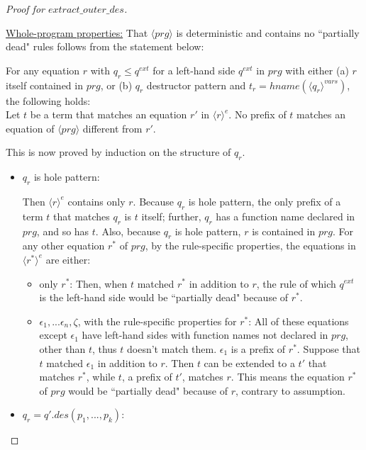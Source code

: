 \documentclass[11pt]{article} %
\begin{document}
\begin{proof}[Proof for $extract\_outer\_des$]
\begin{itemize}
\begin{itemize}
\end{itemize}

\end{itemize}

\underline{Whole-program properties:} That $\langle prg \rangle$ is deterministic and contains no ``partially dead" rules follows from the statement below:
\begin{center}
For any equation $r$ with $q_r \leq q^{ext}$ for a left-hand side $q^{ext}$ in $prg$ with either (a) $r$ itself contained in $prg$, or (b) $q_r$ destructor pattern and $t_r = hname(\langle q_r \rangle^{vars})$, the following holds:\\
Let $t$ be a term that matches an equation $r'$ in $\langle r \rangle^e$. No prefix of $t$ matches an equation of $\langle prg \rangle$ different from $r'$.
\end{center}
This is now proved by induction on the structure of $q_r$.

\begin{itemize}
\item $q_r$ is hole pattern:

Then $\langle r \rangle^e$ contains only $r$. Because $q_r$ is hole pattern, the only prefix of a term $t$ that matches $q_r$ is $t$ itself; further, $q_r$ has a function name declared in $prg$, and so has $t$. Also, because $q_r$ is hole pattern, $r$ is contained in $prg$. For any other equation $r^*$ of $prg$, by the rule-specific properties, the equations in $\langle r^* \rangle^e$ are either:
\begin{itemize}
\item only $r^*$: Then, when $t$ matched $r^*$ in addition to $r$, the rule of which $q^{ext}$ is the left-hand side would be ``partially dead" because of $r^*$.

\item $\epsilon_1, ... \epsilon_n, \zeta$, with the rule-specific properties for $r^*$: All of these equations except $\epsilon_1$ have left-hand sides with function names not declared in $prg$, other than $t$, thus $t$ doesn't match them. $\epsilon_1$ is a prefix of $r^*$. Suppose that $t$ matched $\epsilon_1$ in addition to $r$. Then $t$ can be extended to a $t'$ that matches $r^*$, while $t$, a prefix of $t'$, matches $r$. This means the equation $r^*$ of $prg$ would be ``partially dead" because of $r$, contrary to assumption.
\end{itemize}

\item $q_r = q'.des(p_1, ..., p_k)$:


\end{itemize}
\end{proof}
\end{document}
